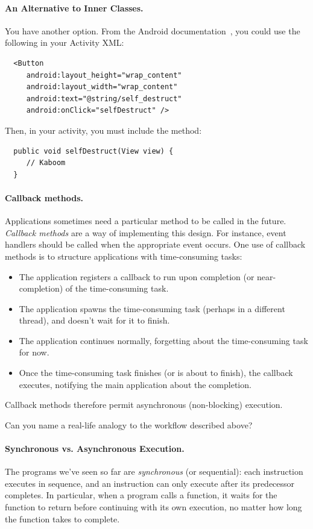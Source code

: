 \paragraph{An Alternative to Inner Classes.}
You have another option. From the Android documentation~\cite{android:button}, you could use the following
in your Activity XML:
\begin{verbatim}
  <Button
     android:layout_height="wrap_content"
     android:layout_width="wrap_content"
     android:text="@string/self_destruct"
     android:onClick="selfDestruct" />
\end{verbatim}

Then, in your activity, you must include the method:
\begin{verbatim}
  public void selfDestruct(View view) {
     // Kaboom
  }
\end{verbatim}

\paragraph{Callback methods.} Applications sometimes need a particular
method to be called in the future. \emph{Callback methods} are a way of
implementing this design. For instance, event handlers should be called 
when the appropriate event occurs. 
One use of callback methods is to structure applications with 
time-consuming tasks:
\begin{itemize}
\item The application registers a callback to run upon completion (or
  near-completion) of the time-consuming task.
\item The application spawns the time-consuming task (perhaps in a
  different thread), and doesn't wait for it to finish.
\item The application continues normally, forgetting about the
  time-consuming task for now.
\item Once the time-consuming task finishes (or is about to finish),
  the callback executes, notifying the main application about the
  completion.
\end{itemize}
Callback methods therefore permit asynchronous (non-blocking) execution.

{\sf Can you name a real-life analogy to the workflow described above?}
\\[1em]

\paragraph{Synchronous vs. Asynchronous Execution.} The programs we've
seen so far are \emph{synchronous} (or sequential): each instruction
executes in sequence, and an instruction can only execute after its
predecessor completes.
In particular, when a program calls a function, it waits for the function
to return before continuing with its own execution, no matter how long
the function takes to complete.

